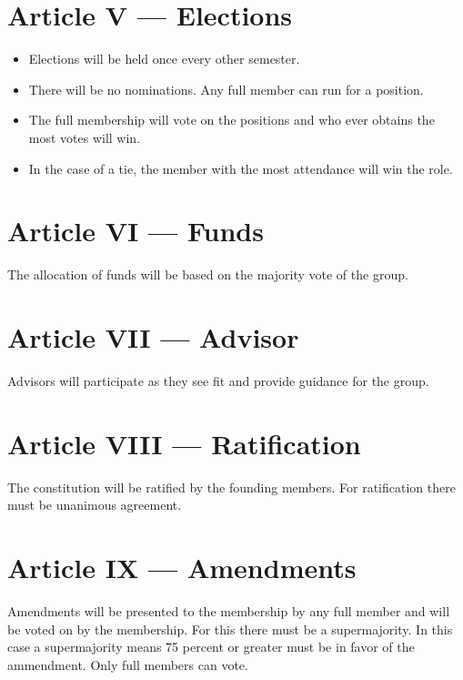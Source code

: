 \documentclass{article}
\begin{document}
\section{Article V --- Elections}

\begin{itemize}
	\item
		Elections will be held once every other semester.
	\item
		There will be no nominations. Any full member can run for a position.
	\item
		The full membership will vote on the positions and who ever obtains
		the most votes will win.
	\item
		In the case of a tie, the member with the most attendance will win the
		role.
\end{itemize}

\section{Article VI --- Funds}

The allocation of funds will be based on the majority vote of the group.

\section{Article VII --- Advisor}

Advisors will participate as they see fit and provide guidance for the
group.

\section{Article VIII --- Ratification}

The constitution will be ratified by the founding members. For
ratification there must be unanimous agreement.

\section{Article IX --- Amendments}

Amendments will be presented to the membership by any full member and
will be voted on by the membership. For this there must be a
supermajority. In this case a supermajority means 75 percent or greater
must be in favor of the ammendment. Only full members can vote.
\end{document}
